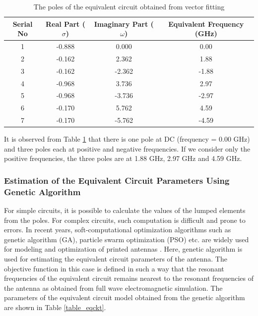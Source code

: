 \begin{table}
\centering
\caption{The poles of the equivalent circuit obtained from vector fitting}\label{table_poles}
\begin{tabular}{|c|c|c|c|}
  \hline
  Serial No & Real Part ($\sigma$) & Imaginary Part ($\omega$) & Equivalent Frequency (GHz) \\ \hline
 1 & -0.888 & 0.000 & 0.00 \\ \hline
 2 & -0.162 & 2.362 & 1.88 \\ \hline
 3 & -0.162 & -2.362 & -1.88 \\ \hline
 4 & -0.968 & 3.736 & 2.97 \\ \hline
 5 & -0.968 & -3.736 & -2.97 \\ \hline
 6 & -0.170 & 5.762 & 4.59 \\ \hline
 7 & -0.170 & -5.762 & -4.59 \\ \hline
\end{tabular}
\end{table}

It is observed from Table \ref{table_poles} that there is one pole at DC (frequency = 0.00 GHz) and three poles each at positive and negative frequencies. If we consider only the positive frequencies, the three poles are at 1.88 GHz, 2.97 GHz and 4.59 GHz.

\subsubsection{Estimation of the Equivalent Circuit Parameters Using Genetic Algorithm}
For simple circuits, it is possible to calculate the values of the lumped elements from the poles. For complex circuits, such computation is difficult and prone to errors. In recent years, soft-computational optimization algorithms such as genetic algorithm (GA), particle swarm optimization (PSO) etc. are widely used for modeling and optimization of printed antennas \cite{antSoftAppReview}. Here, genetic algorithm is used for estimating the equivalent circuit parameters of the antenna. The objective function in this case is defined in such a way that the resonant frequencies of the equivalent circuit remains nearest to the resonant frequencies of the antenna as obtained from full wave electromagnetic simulation. The parameters of the equivalent circuit model obtained from the genetic algorithm are shown in Table \ref{table_eqckt}.

